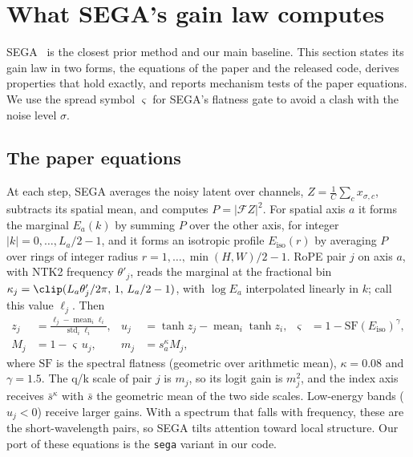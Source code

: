 \section{What SEGA's gain law computes}
\label{sec:sega}

SEGA~\citep{sega2026} is the closest prior method and our main baseline. This section states its gain law in two forms, the equations of the paper and the released code, derives properties that hold exactly, and reports mechanism tests of the paper equations. We use the spread symbol $\varsigma$ for SEGA's flatness gate to avoid a clash with the noise level $\sigma$.


\subsection{The paper equations}
\label{sec:sega-paper}
At each step, SEGA averages the noisy latent over channels, $Z = \frac1C\sum_c x_{\sigma,c}$, subtracts its spatial mean, and computes $P=|\mathcal F Z|^2$. For spatial axis $a$ it forms the marginal $E_a(k)$ by summing $P$ over the other axis, for integer $|k|=0,\dots,L_a/2-1$, and it forms an isotropic profile $E_{\mathrm{iso}}(r)$ by averaging $P$ over rings of integer radius $r=1,\dots,\min(H,W)/2-1$. RoPE pair $j$ on axis $a$, with NTK2 frequency $\theta'_j$, reads the marginal at the fractional bin $\kappa_j=\clip(L_a\theta'_j/2\pi,\,1,\,L_a/2-1)$, with $\log E_a$ interpolated linearly in $k$; call this value $\ell_j$. Then
\begin{align}
z_j &= \frac{\ell_j - \operatorname{mean}_i \ell_i}{\operatorname{std}_i \ell_i}, &
u_j &= \tanh z_j - \operatorname{mean}_i \tanh z_i, &
\varsigma &= 1-\mathrm{SF}(E_{\mathrm{iso}})^{\gamma},
\label{eq:sega-z}\\
M_j &= 1-\varsigma\,u_j, &
m_j &= s_a^{\kappa} M_j, &&
\label{eq:sega-m}
\end{align}
where $\mathrm{SF}$ is the spectral flatness (geometric over arithmetic mean), $\kappa=0.08$ and $\gamma=1.5$. The q/k scale of pair $j$ is $m_j$, so its logit gain is $m_j^2$, and the index axis receives $\bar s^{\kappa}$ with $\bar s$ the geometric mean of the two side scales. Low-energy bands ($u_j<0$) receive larger gains. With a spectrum that falls with frequency, these are the short-wavelength pairs, so SEGA tilts attention toward local structure. Our port of these equations is the \texttt{sega} variant in our code.

